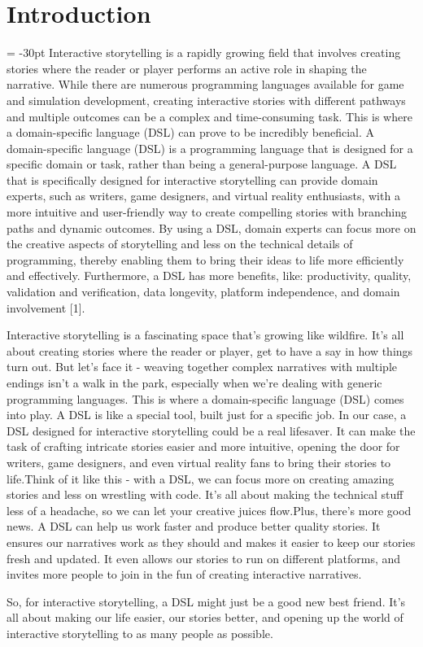 \chapter*{Introduction}
\oddsidemargin = -30pt
    Interactive storytelling is a rapidly growing field that involves creating stories where the reader or player performs an active role in shaping the narrative. While there are numerous programming languages available for game and simulation development, creating interactive stories with different pathways and multiple outcomes can be a complex and time-consuming task. This is where a domain-specific language (DSL) can prove to be incredibly beneficial. A domain-specific language (DSL) is a programming language that is designed for a specific domain or task, rather than being a general-purpose language. A DSL that is specifically designed for interactive storytelling can provide domain experts, such as writers, game designers, and virtual reality enthusiasts, with a more intuitive and user-friendly way to create compelling stories with branching paths and dynamic outcomes. By using a DSL, domain experts can focus more on the creative aspects of storytelling and less on the technical details of programming, thereby enabling them to bring their ideas to life more efficiently and effectively. Furthermore, a DSL has more benefits, like: productivity, quality, validation and verification, data longevity, platform independence, and domain involvement [1].
    
    Interactive storytelling is a fascinating space that's growing like wildfire. It's all about creating stories where the reader or player, get to have a say in how things turn out. But let's face it - weaving together complex narratives with multiple endings isn't a walk in the park, especially when we're dealing with generic programming languages.
    This is where a domain-specific language (DSL) comes into play. A DSL is like a special tool, built just for a specific job. In our case, a DSL designed for interactive storytelling could be a real lifesaver. It can make the task of crafting intricate stories easier and more intuitive, opening the door for writers, game designers, and even virtual reality fans to bring their stories to life.Think of it like this - with a DSL, we can focus more on creating amazing stories and less on wrestling with code. It's all about making the technical stuff less of a headache, so we can let your creative juices flow.Plus, there's more good news. A DSL can help us work faster and produce better quality stories. It ensures our narratives work as they should and makes it easier to keep our stories fresh and updated. It even allows our stories to run on different platforms, and invites more people to join in the fun of creating interactive narratives.
    
    So, for interactive storytelling, a DSL might just be a good new best friend. It's all about making our life easier, our stories better, and opening up the world of interactive storytelling to as many people as possible.
    
    
    
    
    \\
    \\

